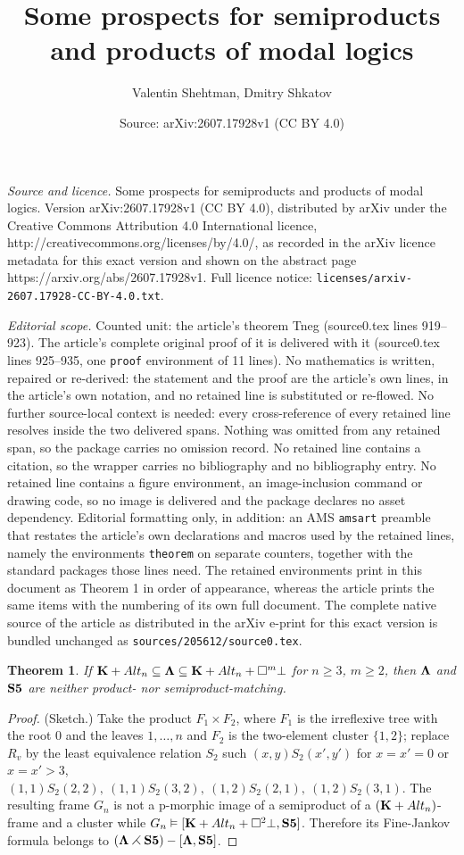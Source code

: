 \documentclass[10pt,a4paper]{amsart}
\title{Some prospects for semiproducts and products of modal logics}
\author{Valentin Shehtman, Dmitry Shkatov}
\date{Source: arXiv:2607.17928v1 (CC BY 4.0)}
\newtheorem{theorem}{Theorem}
\def\BK{{\bf K}}
\def\bLa{{\bf \Lambda}}
\def\bS5{{\bf S5}}
\def\mo{\vDash}
\def\rtt{\rightthreetimes}
\def\sbq{\subseteq}
\def\sqr{\square}
\def\ti{\times}
\begin{document}
\maketitle

\noindent\emph{Source and licence.} Some prospects for semiproducts and products of modal logics. Version arXiv:2607.17928v1 (CC BY 4.0), distributed by arXiv under the Creative Commons Attribution 4.0 International licence, http://creativecommons.org/licenses/by/4.0/, as recorded in the arXiv licence metadata for this exact version and shown on the abstract page https://arxiv.org/abs/2607.17928v1. Full licence notice: \texttt{licenses/arxiv-2607.17928-CC-BY-4.0.txt}.\par\smallskip

\noindent\textit{Editorial scope.} Counted unit: the article's theorem Tneg (source0.tex lines 919--923). The article's complete original proof of it is delivered with it (source0.tex lines 925--935, one \texttt{proof} environment of 11 lines). No mathematics is written, repaired or re-derived: the statement and the proof are the article's own lines, in the article's own notation, and no retained line is substituted or re-flowed.  No further source-local context is needed: every cross-reference of every retained line resolves inside the two delivered spans.  Nothing was omitted from any retained span, so the package carries no omission record.  No retained line contains a citation, so the wrapper carries no bibliography and no bibliography entry.  No retained line contains a figure environment, an image-inclusion command or drawing code, so no image is delivered and the package declares no asset dependency.  Editorial formatting only, in addition: an AMS \texttt{amsart} preamble that restates the article's own declarations and macros used by the retained lines, namely the environments \texttt{theorem} on separate counters, together with the standard packages those lines need.  The retained environments print in this document as Theorem 1 in order of appearance, whereas the article prints the same items with the numbering of its own full document.  The complete native source of the article as distributed in the arXiv e-print for this exact version is bundled unchanged as \texttt{sources/205612/source0.tex}.
\begin{theorem}\label{Tneg}
  If $\BK+Alt_n\sbq\bLa\sbq\BK+Alt_n+\sqr^m\bot$ for $n\geq 3$,
  $m\geq 2$, then
  $\bLa$ and $\bS5$ are neither product- nor semiproduct-matching.
\end{theorem}

\begin{proof} (Sketch.) Take the product $F_1\ti F_2$, where $F_1$ is
  the irreflexive tree with the root $0$ and the leaves $1,\ldots,n$
  and $F_2$ is the two-element cluster $\{1,2\}$; replace $R_v$ by the
  least equivalence relation $S_2$ such $(x,y)S_2(x',y')$ for $x=x'=0$
  or $x=x'>3$,
  $(1,1)S_2(2,2), ~(1,1)S_2(3,2),~(1,2)S_2(2,1), ~(1,2)S_2(3,1)$. The
  resulting frame $G_n$ is not a p-morphic image of a semiproduct of a
  $(\BK+Alt_n)$-frame and a cluster while
  $G_n\mo [\BK+Alt_n+\sqr^2\bot,\bS5]$. Therefore its Fine-Jankov
  formula belongs to $(\bLa\rtt \bS5)-[\bLa,\bS5]$.
\end{proof}
\end{document}
